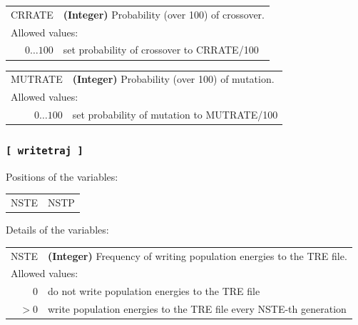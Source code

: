 \documentclass[10pt,a4paper]{report}
\numberwithin{equation}{section}
\begin{document}
{
\begin{tabular}{r@{ : }l}
\label{descr:crrate}
    CRRATE&\textbf{(Integer)} Probability (over 100) of crossover.                                                                 \\ 
\multicolumn{2}{l}{Allowed values:} \\ 
\(0\ldots 100\)&set probability of crossover to CRRATE/100                                                           \\ 
\end{tabular}
\vspace{1ex}
}

{
\begin{tabular}{r@{ : }l}
\label{descr:mutrate}
   MUTRATE&\textbf{(Integer)} Probability (over 100) of mutation.                                                                  \\ 
\multicolumn{2}{l}{Allowed values:} \\ 
\(0\ldots 100\)&set probability of mutation to MUTRATE/100                                                           \\ 
\end{tabular}
\vspace{1ex}
}

\subsubsection{\texttt{[~writetraj~]}}
\label{sec:inp-writetraj}

Positions of the variables:
\begin{center}
  \begin{tabular}{ll}
    NSTE & NSTP \\
  \end{tabular}
\end{center}

\noindent Details of the variables:
\vspace{2ex}

{
\begin{tabular}{r@{ : }l}
\label{descr:nste}
      NSTE&\textbf{(Integer)} Frequency of writing population energies to the TRE file.                                                \\ 
\multicolumn{2}{l}{Allowed values:} \\ 
     \(0\)&do not write population energies to the TRE file                                                     \\ 
    \(>0\)&write population energies to the TRE file every NSTE-th generation                                   \\ 
\end{tabular}
\vspace{1ex}
}
\end{document}

